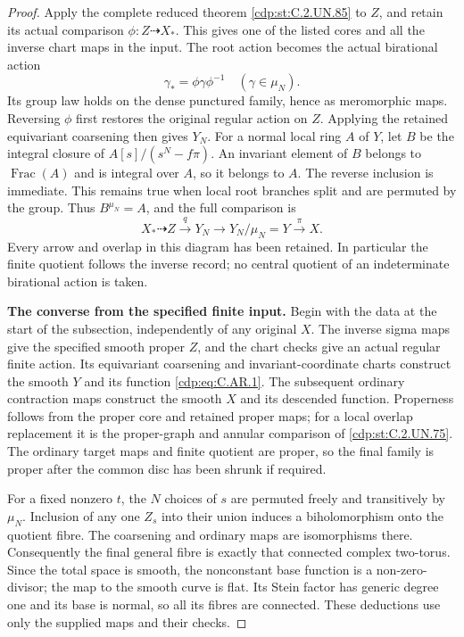 \begin{proof}
Apply the complete reduced theorem \ref{cdp:st:C.2.UN.85} to
\(Z\), and retain its actual comparison
\(\phi:Z\dashrightarrow X_*\). This gives
one of the listed cores and all the inverse
chart maps in the input. The root action
becomes the actual birational action
\[
            \gamma_* =\phi\gamma\phi^{-1}
                            \quad(\gamma\in\mu_N).
 \tag{C.AR.12}\label{cdp:eq:C.AR.12}
\]
Its group law holds on the dense punctured
family, hence as meromorphic maps. Reversing
\(\phi\) first restores the original regular
action on \(Z\). Applying the retained
equivariant coarsening then gives \(Y_N\).
For a normal local ring \(A\) of \(Y\),
let \(B\) be the integral closure of
\(A[s]/(s^N-f\pi)\). An invariant element
of \(B\) belongs to \(\operatorname{Frac}(A)\)
and is integral over \(A\), so it belongs
to \(A\). The reverse inclusion is immediate.
This remains true when local root branches
split and are permuted by the group. Thus
\(B^{\mu_N}=A\), and the full comparison is
\[
 X_*\dashrightarrow Z\xrightarrow{q}Y_N
              \longrightarrow Y_N/\mu_N=Y
                       \xrightarrow{\pi}X.
 \tag{C.AR.13}\label{cdp:eq:C.AR.13}
\]
Every arrow and overlap in this diagram has
been retained. In particular the finite
quotient follows the inverse record; no
central quotient of an indeterminate
birational action is taken.

\par\medskip\noindent\textbf{The converse from the specified finite input.}
Begin with the data at the start of the
subsection, independently of any original
\(X\). The inverse sigma maps give the
specified smooth proper \(Z\), and the
chart checks give an actual regular finite
action. Its equivariant coarsening and
invariant-coordinate charts construct the
smooth \(Y\) and its function \eqref{cdp:eq:C.AR.1}.
The subsequent ordinary contraction maps
construct the smooth \(X\) and its descended
function. Properness follows from the
proper core and retained proper maps;
for a local overlap replacement it is the
proper-graph and annular comparison of
\ref{cdp:st:C.2.UN.75}. The ordinary target maps and finite
quotient are proper, so the final family
is proper after the common disc has been
shrunk if required.

For a fixed nonzero \(t\), the \(N\)
choices of \(s\) are permuted freely and
transitively by \(\mu_N\). Inclusion of
any one \(Z_s\) into their union induces
a biholomorphism onto the quotient fibre.
The coarsening and ordinary maps are
isomorphisms there. Consequently the
final general fibre is exactly that
connected complex two-torus. Since the
total space is smooth, the nonconstant
base function is a non-zero-divisor;
the map to the smooth curve is flat.
Its Stein factor has generic degree one
and its base is normal, so all its fibres
are connected. These deductions use only
the supplied maps and their checks.


\end{proof}
